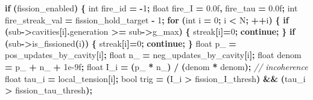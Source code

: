 \documentclass[
  11pt,
  a4paper,
]{article}
\newenvironment{Shaded}{\begin{snugshade}}{\end{snugshade}}
\newcommand{\BuiltInTok}[1]{#1}
\newcommand{\CommentTok}[1]{\textcolor[rgb]{0.56,0.35,0.01}{\textit{#1}}}
\newcommand{\ControlFlowTok}[1]{\textcolor[rgb]{0.13,0.29,0.53}{\textbf{#1}}}
\newcommand{\DataTypeTok}[1]{\textcolor[rgb]{0.13,0.29,0.53}{#1}}
\newcommand{\DecValTok}[1]{\textcolor[rgb]{0.00,0.00,0.81}{#1}}
\newcommand{\FloatTok}[1]{\textcolor[rgb]{0.00,0.00,0.81}{#1}}
\newcommand{\NormalTok}[1]{#1}
\newcommand{\OperatorTok}[1]{\textcolor[rgb]{0.81,0.36,0.00}{\textbf{#1}}}
\newcommand{\VariableTok}[1]{\textcolor[rgb]{0.00,0.00,0.00}{#1}}
\begin{document}
\begin{Shaded}
\begin{Highlighting}[]
\ControlFlowTok{if} \OperatorTok{(}\NormalTok{fission\_enabled}\OperatorTok{)} \OperatorTok{\{}
    \DataTypeTok{int}\NormalTok{   fire\_id }\OperatorTok{=} \OperatorTok{{-}}\DecValTok{1}\OperatorTok{;}
    \DataTypeTok{float}\NormalTok{ fire\_I  }\OperatorTok{=} \FloatTok{0.0}\BuiltInTok{f}\OperatorTok{,}\NormalTok{ fire\_tau }\OperatorTok{=} \FloatTok{0.0}\BuiltInTok{f}\OperatorTok{;}
    \DataTypeTok{int}\NormalTok{   fire\_streak\_val }\OperatorTok{=}\NormalTok{ fission\_hold\_target }\OperatorTok{{-}} \DecValTok{1}\OperatorTok{;}
    \ControlFlowTok{for} \OperatorTok{(}\DataTypeTok{int}\NormalTok{ i }\OperatorTok{=} \DecValTok{0}\OperatorTok{;}\NormalTok{ i }\OperatorTok{\textless{}}\NormalTok{ N}\OperatorTok{;} \OperatorTok{++}\NormalTok{i}\OperatorTok{)} \OperatorTok{\{}
        \ControlFlowTok{if} \OperatorTok{(}\NormalTok{sub}\OperatorTok{{-}\textgreater{}}\NormalTok{cavities}\OperatorTok{[}\NormalTok{i}\OperatorTok{].}\NormalTok{generation }\OperatorTok{\textgreater{}=}\NormalTok{ sub}\OperatorTok{{-}\textgreater{}}\VariableTok{g\_max}\OperatorTok{)} \OperatorTok{\{}\NormalTok{ streak}\OperatorTok{[}\NormalTok{i}\OperatorTok{]=}\DecValTok{0}\OperatorTok{;} \ControlFlowTok{continue}\OperatorTok{;} \OperatorTok{\}}
        \ControlFlowTok{if} \OperatorTok{(}\NormalTok{sub}\OperatorTok{{-}\textgreater{}}\NormalTok{is\_fissioned}\OperatorTok{(}\NormalTok{i}\OperatorTok{))}                       \OperatorTok{\{}\NormalTok{ streak}\OperatorTok{[}\NormalTok{i}\OperatorTok{]=}\DecValTok{0}\OperatorTok{;} \ControlFlowTok{continue}\OperatorTok{;} \OperatorTok{\}}
        \DataTypeTok{float} \VariableTok{p\_} \OperatorTok{=}\NormalTok{ pos\_updates\_by\_cavity}\OperatorTok{[}\NormalTok{i}\OperatorTok{];}
        \DataTypeTok{float} \VariableTok{n\_} \OperatorTok{=}\NormalTok{ neg\_updates\_by\_cavity}\OperatorTok{[}\NormalTok{i}\OperatorTok{];}
        \DataTypeTok{float}\NormalTok{ denom }\OperatorTok{=} \VariableTok{p\_} \OperatorTok{+} \VariableTok{n\_} \OperatorTok{+} \FloatTok{1e{-}9}\BuiltInTok{f}\OperatorTok{;}
        \DataTypeTok{float}\NormalTok{ I\_i   }\OperatorTok{=} \OperatorTok{(}\VariableTok{p\_} \OperatorTok{*} \VariableTok{n\_}\OperatorTok{)} \OperatorTok{/} \OperatorTok{(}\NormalTok{denom }\OperatorTok{*}\NormalTok{ denom}\OperatorTok{);}          \CommentTok{// incoherence}
        \DataTypeTok{float}\NormalTok{ tau\_i }\OperatorTok{=}\NormalTok{ local\_tension}\OperatorTok{[}\NormalTok{i}\OperatorTok{];}
        \DataTypeTok{bool}\NormalTok{  trig  }\OperatorTok{=} \OperatorTok{(}\NormalTok{I\_i }\OperatorTok{\textgreater{}}\NormalTok{ fission\_I\_thresh}\OperatorTok{)} \OperatorTok{\&\&} \OperatorTok{(}\NormalTok{tau\_i }\OperatorTok{\textgreater{}}\NormalTok{ fission\_tau\_thresh}\OperatorTok{);}

\end{Highlighting}
\end{Shaded}
\end{document}
